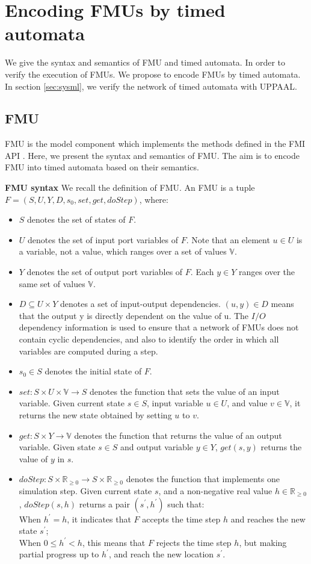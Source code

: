 \section{Encoding FMUs by timed automata}
\label{sec:fmi}
We give the syntax and semantics of FMU and timed automata. In order to verify the  execution of FMUs. We propose to encode FMUs by timed automata. In section \ref{sec:sysml}, we verify the network of timed automata with UPPAAL.
\subsection{FMU}
FMU is the model component which implements the methods defined in the FMI API \cite{Tripakis15}. Here, we present the syntax and semantics of FMU. The aim is to encode FMU into timed automata based on their semantics. 
\begin{definition}
\textbf{FMU syntax}
We recall the definition of FMU. An FMU is a tuple $F=(S,U,Y,D,s_{0},set,get,doStep)$, where:
\end{definition}
\begin{itemize}
\item
$S$ denotes the set of states of $F$. 
\item
$U$ denotes the set of input port variables of $F$. Note that an element $u \in U$ is a variable, not a value, which ranges over a set of values $\mathbb{V}$. 
\item
$Y$ denotes the set of output port variables of $F$. Each $y \in Y$ ranges over the same set of values $\mathbb{V}$.
\item
$D \subseteq U \times Y$ denotes a set of input-output dependencies. $(u,y) \in D $ means that the output y is directly dependent on the value of u. The $I/O$ dependency information is used to ensure that a network of FMUs does not contain cyclic dependencies, and also to identify the order in which all variables are computed during a step.
\item
$s_{0} \in S$ denotes the initial state of $F$.
\item
$set : S \times U \times \mathbb{V} \rightarrow S$ denotes the function that sets the value of an input variable. Given current state $s \in S$, input variable $u \in U$, and value $v \in \mathbb{V}$, it returns the new state obtained by setting $u$ to $v$.
\item
$get : S \times Y \rightarrow \mathbb{V}$ denotes the function that returns the value of an output variable. Given state $s \in S$ and output variable $y \in Y$, $get(s,y)$ returns the value of $y$ in $s$.
\item
$doStep : S \times \mathbb{R}_{\geqslant{0}} \rightarrow S \times \mathbb{R}_{\geqslant{0}}$ denotes the function that implements one simulation step. Given current state $s$, and a non-negative real value $h \in \mathbb{R}_{\geqslant{0}}$, $doStep(s,h)$ returns a pair $(s^{\prime},h^{\prime})$ such that:
\\
When $h^{\prime} = h$, it indicates that $F$ accepts the time step $h$ and reaches the new state $s^{\prime}$;
\\
When $0 \leqslant h^{\prime} < h$, this means that $F$ rejects the time step $h$, but making partial progress up to $h^{\prime}$, and reach the new location $s^{\prime}$.
\end{itemize}
